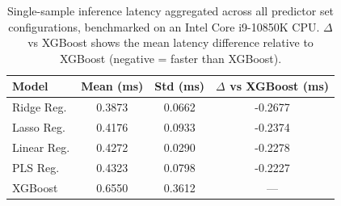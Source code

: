         \begin{table}[htbp]
        \centering
        \captionsetup{font=footnotesize}
        \caption{Single-sample inference latency aggregated across all predictor set configurations, benchmarked on an Intel Core i9-10850K CPU. $\Delta$ vs XGBoost shows the mean latency difference relative to XGBoost (negative = faster than XGBoost).}
        \footnotesize
        \setlength{\tabcolsep}{5pt}
        \renewcommand{\arraystretch}{1.2}
        \begin{tabular}{l|ccc}
        \hline\hline
        \textbf{Model} & \textbf{Mean (ms)} & \textbf{Std (ms)} & \textbf{$\Delta$ vs XGBoost (ms)} \\
        \hline
        Ridge Reg. & 0.3873 & 0.0662 & -0.2677 \\
        Lasso Reg. & 0.4176 & 0.0933 & -0.2374 \\
        Linear Reg. & 0.4272 & 0.0290 & -0.2278 \\
        PLS Reg. & 0.4323 & 0.0798 & -0.2227 \\
        XGBoost & 0.6550 & 0.3612 & --- \\
        \hline
        \end{tabular}
        \label{tab:latency}
        \end{table}
